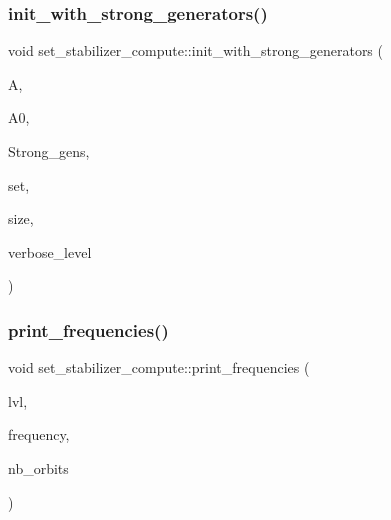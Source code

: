 \mbox{\label{classset__stabilizer__compute_ad6def8c34e1eba080f0383038cd76016}} 
\subsubsection{\texorpdfstring{init\+\_\+with\+\_\+strong\+\_\+generators()}{init\_with\_strong\_generators()}}
{\footnotesize\ttfamily void set\+\_\+stabilizer\+\_\+compute\+::init\+\_\+with\+\_\+strong\+\_\+generators (\begin{DoxyParamCaption}\item[{\mbox{\hyperlink{classaction}{action}} $\ast$}]{A,  }\item[{\mbox{\hyperlink{classaction}{action}} $\ast$}]{A0,  }\item[{\mbox{\hyperlink{classstrong__generators}{strong\+\_\+generators}} $\ast$}]{Strong\+\_\+gens,  }\item[{\mbox{\hyperlink{galois_8h_a09fddde158a3a20bd2dcadb609de11dc}{I\+NT}} $\ast$}]{set,  }\item[{\mbox{\hyperlink{galois_8h_a09fddde158a3a20bd2dcadb609de11dc}{I\+NT}}}]{size,  }\item[{\mbox{\hyperlink{galois_8h_a09fddde158a3a20bd2dcadb609de11dc}{I\+NT}}}]{verbose\+\_\+level }\end{DoxyParamCaption})}

\mbox{\label{classset__stabilizer__compute_aaa16ded0007c24b61d16b8ba65c51283}} 
\subsubsection{\texorpdfstring{print\+\_\+frequencies()}{print\_frequencies()}}
{\footnotesize\ttfamily void set\+\_\+stabilizer\+\_\+compute\+::print\+\_\+frequencies (\begin{DoxyParamCaption}\item[{\mbox{\hyperlink{galois_8h_a09fddde158a3a20bd2dcadb609de11dc}{I\+NT}}}]{lvl,  }\item[{\mbox{\hyperlink{galois_8h_a09fddde158a3a20bd2dcadb609de11dc}{I\+NT}} $\ast$}]{frequency,  }\item[{\mbox{\hyperlink{galois_8h_a09fddde158a3a20bd2dcadb609de11dc}{I\+NT}}}]{nb\+\_\+orbits }\end{DoxyParamCaption})}


